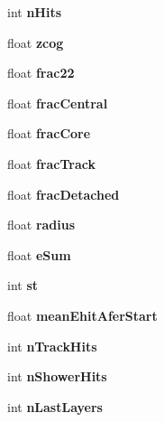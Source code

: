 \begin{DoxyCompactItemize}
\item 
int {\bfseries n\-Hits}\label{classCALICE_1_1IDVariables_a0cd8a74327d19e0dd275460900ee8303}

\item 
float {\bfseries zcog}\label{classCALICE_1_1IDVariables_af17fa542edd2d9c9610fca0dcdf5acac}

\item 
float {\bfseries frac22}\label{classCALICE_1_1IDVariables_a7e13a379b2a52e9df4d9292367096a23}

\item 
float {\bfseries frac\-Central}\label{classCALICE_1_1IDVariables_ae8d3914291472df5e3da3fc3dc397f9a}

\item 
float {\bfseries frac\-Core}\label{classCALICE_1_1IDVariables_aeeb2cc581447846c68fcbbbc9e1b5ad1}

\item 
float {\bfseries frac\-Track}\label{classCALICE_1_1IDVariables_a396128e1deae1110ee2ca821d56279cb}

\item 
float {\bfseries frac\-Detached}\label{classCALICE_1_1IDVariables_af7b8d1861f2a9a8f6309420d89bab5f7}

\item 
float {\bfseries radius}\label{classCALICE_1_1IDVariables_ab62fd60d8f05109604022a40481614c1}

\item 
float {\bfseries e\-Sum}\label{classCALICE_1_1IDVariables_a56a5a9d315367bc218963186fcc65d2f}

\item 
int {\bfseries st}\label{classCALICE_1_1IDVariables_a50c8e7b7ee71ea054514c483dfb77102}

\item 
float {\bfseries mean\-Ehit\-Afer\-Start}\label{classCALICE_1_1IDVariables_a46bf9cf001c7316bebe18b47f169d74a}

\item 
int {\bfseries n\-Track\-Hits}\label{classCALICE_1_1IDVariables_a75904743ab209208c7d3f0bf4d9a000e}

\item 
int {\bfseries n\-Shower\-Hits}\label{classCALICE_1_1IDVariables_a15be803d1c62c06308947d557f8257b2}

\item 
int {\bfseries n\-Last\-Layers}\label{classCALICE_1_1IDVariables_ac0ed8430b50b2f9009cf54e3c8ccced1}

\end{DoxyCompactItemize}


